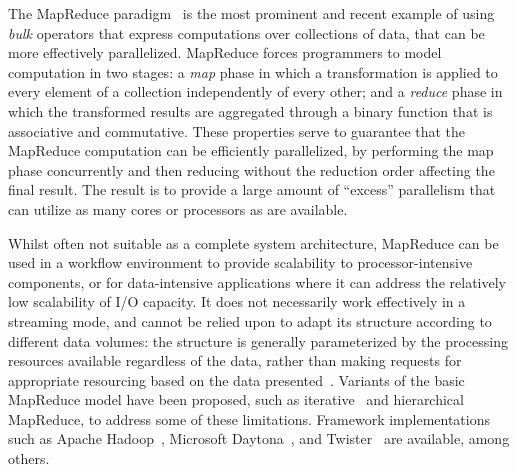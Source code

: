 The MapReduce paradigm~\cite{MapReduce} is the most prominent and recent example of
using \emph{bulk} operators that express computations over collections of data, that can be more
effectively parallelized.  MapReduce forces programmers to model computation in two
stages: a \emph{map} phase in which a transformation is applied to
every element of a collection independently of every other; and a
\emph{reduce} phase in which the transformed results are aggregated
through a binary function that is associative and commutative. These
properties serve to guarantee that the MapReduce computation can be
efficiently parallelized, by performing the map phase concurrently and
then reducing without the reduction order affecting the final
result. The result is to provide a large amount of ``excess''
parallelism that can utilize as many cores or processors as are
available.


Whilst often not suitable as a complete system architecture,
MapReduce can be used in a workflow environment to provide scalability to
processor-intensive components, or for data-intensive applications
where it can address the relatively low scalability of I/O
capacity. It does not necessarily work effectively in a streaming
mode, and cannot be relied upon to adapt its structure according to
different data volumes: the structure is generally parameterized by
the processing resources available regardless of the data, rather than
making requests for appropriate resourcing based on the data
presented~\cite{DataIntensiveMapReduce}. Variants of the basic MapReduce model have been proposed,
such as iterative~\cite{twister} and hierarchical~\cite{hmr} MapReduce, to address some of these limitations. Framework implementations
such as Apache Hadoop~\cite{hadoop}, Microsoft Daytona~\cite{daytona}, and Twister~\cite{twister} are available, among others.

